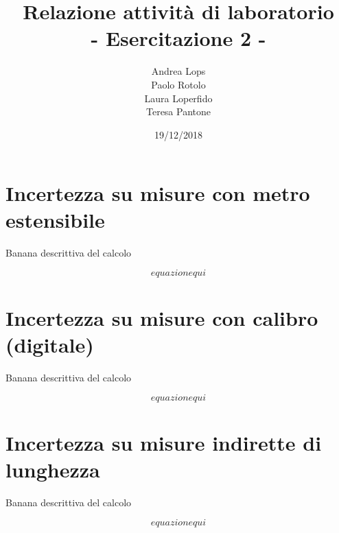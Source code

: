 \documentclass[a4paper]{article}
\title{\textbf{Relazione attività di laboratorio}\\{\normalsize - Esercitazione 2 -}}
\author{Andrea Lops\\
		Paolo Rotolo\\
		Laura Loperfido\\
		Teresa Pantone
	   }
\date{19/12/2018}
\begin{document}
\maketitle

\section {Incertezza su misure con metro estensibile}

Banana descrittiva del calcolo 

\begin{Large} 
	\begin{equation}
		equazione qui
	 \end{equation}
\end{Large}

\section {Incertezza su misure con calibro (digitale)}

Banana descrittiva del calcolo 

\begin{Large} 
	\begin{equation}
		equazione qui
	 \end{equation}
\end{Large}

\section {Incertezza su misure indirette di lunghezza}

Banana descrittiva del calcolo 

\begin{Large} 
	\begin{equation}
		equazione qui
	 \end{equation}
\end{Large}
\end{document}
